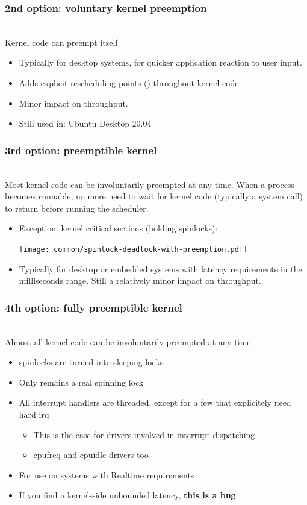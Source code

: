 \begin{frame}
  \frametitle{2nd option: voluntary kernel preemption}
  \\
  Kernel code can preempt itself
  \begin{itemize}
  \item Typically for desktop systems, for quicker application
    reaction to user input.
  \item Adds explicit rescheduling points ()
        throughout kernel code.
  \item Minor impact on throughput.
  \item Still used in: Ubuntu Desktop 20.04
  \end{itemize}
\end{frame}

\begin{frame}
  \frametitle{3rd option: preemptible kernel}
  \\
  Most kernel code can be involuntarily preempted at any time.  When a
  process becomes runnable, no more need to wait for kernel code
  (typically a system call) to return before running the scheduler.
  \begin{itemize}
  \item Exception: kernel critical sections (holding spinlocks):
  \begin{center}
    \texttt{[image: common/spinlock-deadlock-with-preemption.pdf]}
  \end{center}
  \item Typically for desktop or embedded systems with latency
    requirements in the milliseconds range. Still a relatively minor impact on throughput.
  \end{itemize}
\end{frame}

\begin{frame}
	\frametitle{4th option: fully preemptible kernel}
	  \\
	  Almost all kernel code can be involuntarily preempted at any time.
	  \begin{itemize}
	  \item spinlocks are turned into sleeping locks
	  \item Only  remains a real spinning lock
	  \item All interrupt handlers are threaded, except for a few that explicitely need hard irq
		  \begin{itemize}
			  \item This is the case for drivers involved in interrupt dispatching
			  \item cpufreq and cpuidle drivers too
		  \end{itemize}
	  \item For use on systems with Realtime requirements
	  \item If you find a kernel-side unbounded latency, \textbf{this is a bug}
	  \end{itemize}
\end{frame}

